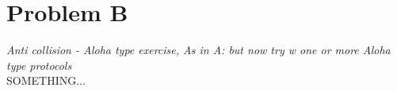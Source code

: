 \section{Problem B}
\textit{Anti collision - Aloha type exercise, As in A: but now try w one or more Aloha type protocols}\\

SOMETHING...


